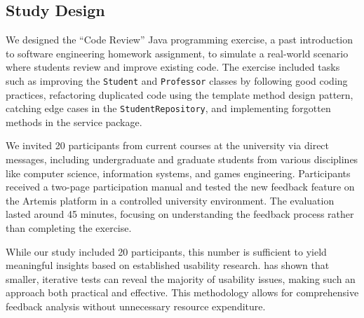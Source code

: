 \documentclass[manuscript,screen,review]{acmart}
\begin{document}

\subsection{Study Design}
We designed the ``Code Review'' Java programming exercise, a past introduction to software engineering homework assignment, to simulate a real-world scenario where students review and improve existing code.
The exercise included tasks such as improving the \texttt{Student} and \texttt{Professor} classes by following good coding practices, refactoring duplicated code using the template method design pattern, catching edge cases in the \texttt{StudentRepository}, and implementing forgotten methods in the service package.

We invited 20 participants from current courses at the university via direct messages, including undergraduate and graduate students from various disciplines like computer science, information systems, and games engineering. Participants received a two-page participation manual and tested the new feedback feature on the Artemis platform in a controlled university environment. The evaluation lasted around 45 minutes, focusing on understanding the feedback process rather than completing the exercise.

While our study included 20 participants, this number is sufficient to yield meaningful insights based on established usability research. \citet{nielsen:2000:WhyYouOnly} has shown that smaller, iterative tests can reveal the majority of usability issues, making such an approach both practical and effective. This methodology allows for comprehensive feedback analysis without unnecessary resource expenditure.
\end{document}
